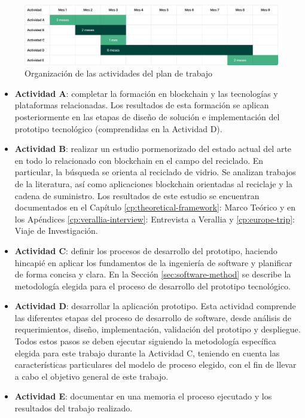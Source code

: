\begin{figure}[!htb]
    \centering
    \includegraphics[width=\textwidth]{Figures/activities-plan.png}
    \caption{Organización de las actividades del plan de trabajo}
    \label{fig:activities-plan}
\end{figure}

\begin{itemize}
	\item \textbf{Actividad A}: completar la formación en blockchain y las tecnologías y plataformas relacionadas. Los resultados de esta formación se aplican posteriormente en las etapas de diseño de solución e implementación del prototipo tecnológico (comprendidas en la Actividad D).
	\item \textbf{Actividad B}: realizar un estudio pormenorizado del estado actual del arte en todo lo relacionado con blockchain en el campo del reciclado. En particular, la búsqueda se orienta al reciclado de vidrio. Se analizan trabajos de la literatura, así como aplicaciones blockchain orientadas al reciclaje y la cadena de suministro. Los resultados de este estudio se encuentran documentados en el Capítulo \ref{cp:theoretical-framework}: Marco Teórico y en los Apéndices \ref{cp:verallia-interview}: Entrevista a Verallia y \ref{cp:europe-trip}: Viaje de Investigación.
	\item \textbf{Actividad C}: definir los procesos de desarrollo del prototipo, haciendo hincapié en aplicar los fundamentos de la ingeniería de software y planificar de forma concisa y clara. En la Sección \ref{sec:software-method} se describe la metodología elegida para el proceso de desarrollo del prototipo tecnológico.
	\item \textbf{Actividad D}: desarrollar la aplicación prototipo. Esta actividad comprende las diferentes etapas del proceso de desarrollo de software, desde análisis de requerimientos, diseño, implementación, validación del prototipo y despliegue. Todos estos pasos se deben ejecutar siguiendo la metodología específica elegida para este trabajo durante la Actividad C, teniendo en cuenta las características particulares del modelo de proceso elegido, con el fin de llevar a cabo el objetivo general de este trabajo.
	\item \textbf{Actividad E}: documentar en una memoria el proceso ejecutado y los resultados del trabajo realizado.
\end{itemize}

